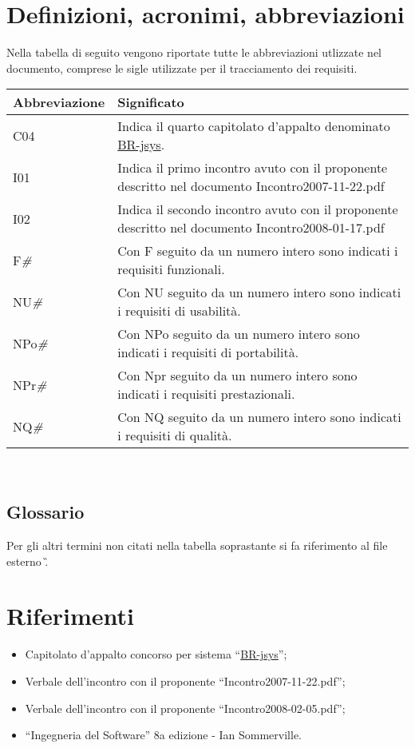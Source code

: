 \section{Definizioni, acronimi, abbreviazioni}
Nella tabella di seguito vengono riportate tutte le abbreviazioni utlizzate nel documento, comprese le sigle utilizzate per il tracciamento dei requisiti.
\begin{center}
\begin{tabular}{||p{3.0cm}||p{8.5cm}||} \hline
\textbf{Abbreviazione} & \textbf{Significato} \\ \hline
C04 & Indica il quarto capitolato d'appalto denominato \underline{BR-jsys}.\\ \hline
I01 & Indica il primo incontro avuto con il proponente descritto nel documento Incontro2007-11-22.pdf\\ \hline
I02 & Indica il secondo incontro avuto con il proponente descritto nel documento Incontro2008-01-17.pdf\\ \hline
F\textit{\#} & Con F seguito da un numero intero sono indicati i requisiti funzionali.\\ \hline
NU\textit{\#} & Con NU seguito da un numero intero sono indicati i requisiti di usabilit\`a.\\ \hline
NPo\textit{\#} & Con NPo seguito da un numero intero sono indicati i requisiti di portabilit\`a.\\ \hline
NPr\textit{\#} & Con Npr seguito da un numero intero sono indicati i requisiti prestazionali.\\ \hline
NQ\textit{\#} & Con NQ seguito da un numero intero sono indicati i requisiti di qualit\`a.\\ \hline

\end{tabular} \\
\end{center}
\subsection{Glossario}
Per gli altri termini non citati nella tabella soprastante si fa riferimento al file esterno \G.
\section{Riferimenti}
\begin{itemize}
\item Capitolato d'appalto concorso per sistema ``\underline{BR-jsys}'';
\item Verbale dell'incontro con il proponente ``Incontro2007-11-22.pdf'';
\item Verbale dell'incontro con il proponente ``Incontro2008-02-05.pdf'';
\item ``Ingegneria del Software'' 8a edizione - Ian Sommerville.
\end{itemize}
